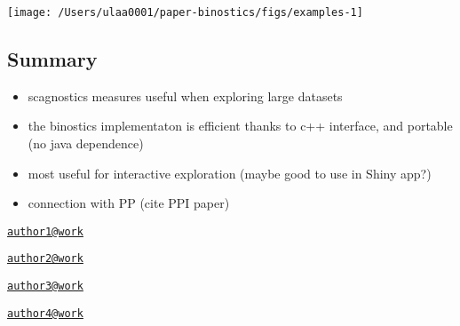 \begin{Schunk}


\begin{center}\texttt{[image: /Users/ulaa0001/paper-binostics/figs/examples-1]} \end{center}

\end{Schunk}

\hypertarget{summary}{%
\subsection{Summary}\label{summary}}

\begin{itemize}
\tightlist
\item
  scagnostics measures useful when exploring large datasets
\item
  the binostics implementaton is efficient thanks to c++ interface, and
  portable (no java dependence)
\item
  most useful for interactive exploration (maybe good to use in Shiny
  app?)
\item
  connection with PP (cite PPI paper)
\end{itemize}




\address{%
Ursula Laa\\
Affiliation\\
line 1\\ line 2\\
}
\href{mailto:author1@work}{\nolinkurl{author1@work}}

\address{%
Dianne Cook\\
Affiliation\\
line 1\\ line 2\\
}
\href{mailto:author2@work}{\nolinkurl{author2@work}}

\address{%
Hadley Wickham\\
Affiliation\\
line 1\\ line 2\\
}
\href{mailto:author3@work}{\nolinkurl{author3@work}}

\address{%
Heike Hofmann\\
Affiliation\\
line 1\\ line 2\\
}
\href{mailto:author4@work}{\nolinkurl{author4@work}}

